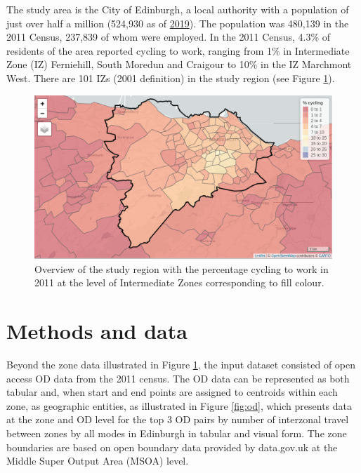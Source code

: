 \documentclass[
]{article}
\begin{document}
The study area is the City of Edinburgh, a local authority with a population of just over half a million (524,930 as of \href{https://www.nrscotland.gov.uk/files/statistics/council-area-data-sheets/city-of-edinburgh-council-profile.html}{2019}).
The population was 480,139 in the 2011 Census, 237,839 of whom were employed.
In the 2011 Census, 4.3\% of residents of the area reported cycling to work, ranging from 1\% in Intermediate Zone (IZ) Ferniehill, South Moredun and Craigour to 10\% in the IZ Marchmont West.
There are 101 IZs (2001 definition) in the study region (see Figure \ref{fig:izs}).

\begin{figure}
\includegraphics[width=0.9\linewidth]{figures/overview-zones-iz} \caption{Overview of the study region with the percentage cycling to work in 2011 at the level of Intermediate Zones corresponding to fill colour.}\label{fig:izs}
\end{figure}

\hypertarget{methods-and-data}{%
\section{Methods and data}\label{methods-and-data}}

Beyond the zone data illustrated in Figure \ref{fig:izs}, the input dataset consisted of open access OD data from the 2011 census.
The OD data can be represented as both tabular and, when start and end points are assigned to centroids within each zone, as geographic entities, as illustrated in Figure \ref{fig:od}, which presents data at the zone and OD level for the top 3 OD pairs by number of interzonal travel between zones by all modes in Edinburgh in tabular and visual form.
The zone boundaries are based on open boundary data provided by data.gov.uk at the Middle Super Output Area (MSOA) level.
\end{document}
